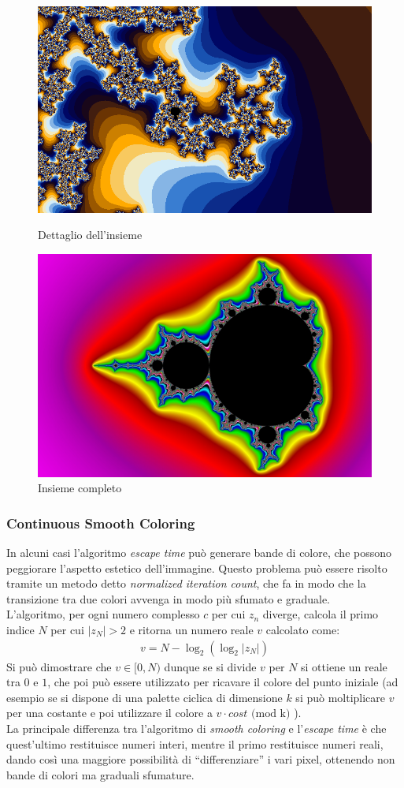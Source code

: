 \documentclass[10pt]{report}
\begin{document}
					\begin{figure}[H]
						\centering
						\includegraphics[width=0.6\linewidth]{"Insieme di Mandelbrot/Escape_Time_Algorithm_bands"}
						\caption*{ \footnotesize{Dettaglio dell'insieme} }
						\label{fig:escape_mandelbrot1}
						\endminipage \hfill
						\centering
						\includegraphics[width=0.6\linewidth]{"Insieme di Mandelbrot/mandelbrot_schifo"}
						\caption*{ \footnotesize{Insieme completo} }
						\label{fig:escape_mandelbrot2}
						\endminipage 
					\end{figure}
			\subsubsection{Continuous Smooth Coloring}
				In alcuni casi l'algoritmo \textit{escape time} può generare bande di colore, che possono peggiorare l'aspetto estetico dell'immagine. Questo problema può essere risolto tramite un metodo detto \textit{normalized iteration count}, che fa in modo che la transizione tra due colori avvenga in modo più sfumato e graduale.\\
				L'algoritmo, per ogni numero complesso $c$ per cui $z_n$ diverge, calcola il primo indice $N$ per cui $|z_N| > 2$ e ritorna un numero reale $v$ calcolato come:
				\begin{gather*}
					v = N - \log_2(\log_2|z_N|)
				\end{gather*}
				Si può dimostrare che $v \in [0,N)$ dunque se si divide $v$ per $N$ si ottiene un reale tra $0$ e $1$, che poi può essere utilizzato per ricavare il colore del punto iniziale (ad esempio se si dispone di una palette ciclica di dimensione $k$ si può moltiplicare $v$ per una costante e poi utilizzare il colore a $v \cdot cost \mbox{ (mod k) }$).\\
				La principale differenza tra l'algoritmo di \textit{smooth coloring} e l'\textit{escape time} è che quest'ultimo restituisce numeri interi, mentre il primo restituisce numeri reali, dando così una maggiore possibilità di ``differenziare'' i vari pixel, ottenendo non bande di colori ma graduali sfumature.
\end{document}
